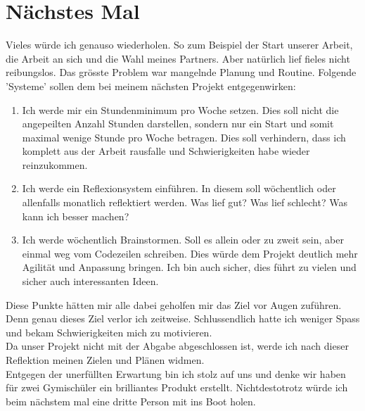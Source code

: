 \section{Nächstes Mal}
Vieles würde ich genauso wiederholen.
So zum Beispiel der Start unserer Arbeit, die Arbeit an sich und die Wahl meines Partners.
Aber natürlich lief fieles nicht reibungslos.
Das grösste Problem war mangelnde Planung und Routine.
Folgende 'Systeme' sollen dem bei meinem nächsten Projekt entgegenwirken:
\begin{enumerate}
    \item Ich werde mir ein Stundenminimum pro Woche setzen.
    Dies soll nicht die angepeilten Anzahl Stunden darstellen, sondern nur ein Start und somit maximal wenige Stunde pro Woche betragen.
    Dies soll verhindern, dass ich komplett aus der Arbeit rausfalle und Schwierigkeiten habe wieder reinzukommen.
    \item Ich werde ein Reflexionsystem einführen.
    In diesem soll wöchentlich oder allenfalls monatlich reflektiert werden.
    Was lief gut? Was lief schlecht? Was kann ich besser machen?
    \item Ich werde wöchentlich Brainstormen.
    Soll es allein oder zu zweit sein, aber einmal weg vom Codezeilen schreiben.
    Dies würde dem Projekt deutlich mehr Agilität und Anpassung bringen.
    Ich bin auch sicher, dies führt zu vielen und sicher auch interessanten Ideen.
\end{enumerate}
Diese Punkte hätten mir alle dabei geholfen mir das Ziel vor Augen zuführen.
Denn genau dieses Ziel verlor ich zeitweise.
Schlussendlich hatte ich weniger Spass und bekam Schwierigkeiten mich zu motivieren. \\
Da unser Projekt nicht mit der Abgabe abgeschlossen ist, werde ich nach dieser Reflektion meinen Zielen und Plänen widmen. \\
Entgegen der unerfüllten Erwartung bin ich stolz auf uns und denke wir haben für zwei Gymischüler ein brilliantes Produkt erstellt.
Nichtdestotrotz würde ich beim nächstem mal eine dritte Person mit ins Boot holen.